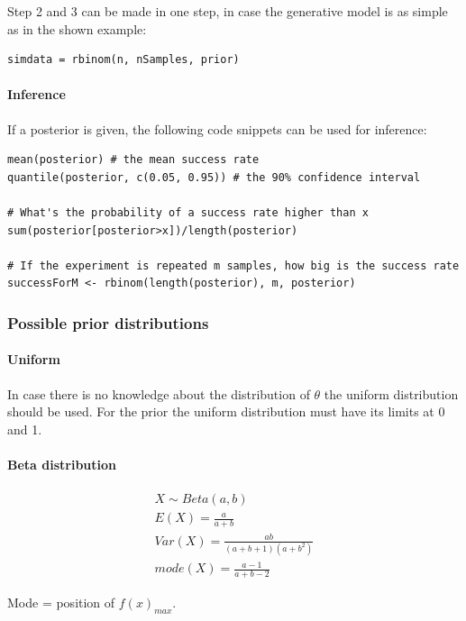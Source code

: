 Step 2 and 3 can be made in one step, in case the generative model is as simple as in the shown example:
\begin{lstlisting}
simdata = rbinom(n, nSamples, prior)
\end{lstlisting}

\paragraph{Inference}
If a posterior is given, the following code snippets can be used for inference:
\begin{lstlisting}
mean(posterior) # the mean success rate
quantile(posterior, c(0.05, 0.95)) # the 90% confidence interval

# What's the probability of a success rate higher than x
sum(posterior[posterior>x])/length(posterior)

# If the experiment is repeated m samples, how big is the success rate
successForM <- rbinom(length(posterior), m, posterior)
\end{lstlisting}

\subsubsection{Possible prior distributions}

\paragraph{Uniform}
In case there is no knowledge about the distribution of $\theta$ the uniform distribution should be used. For the prior the uniform distribution must have its limits at 0 and 1.

\paragraph{Beta distribution}
\begin{gather*}
X\sim Beta(a, b)\\
E(X) = \frac{a}{a+b}\\
Var(X) = \frac{ab}{(a+b+1)(a+b^2)}\\
mode(X) = \frac{a-1}{a+b-2}
\end{gather*}

Mode = position of $f(x)_{max}$.

